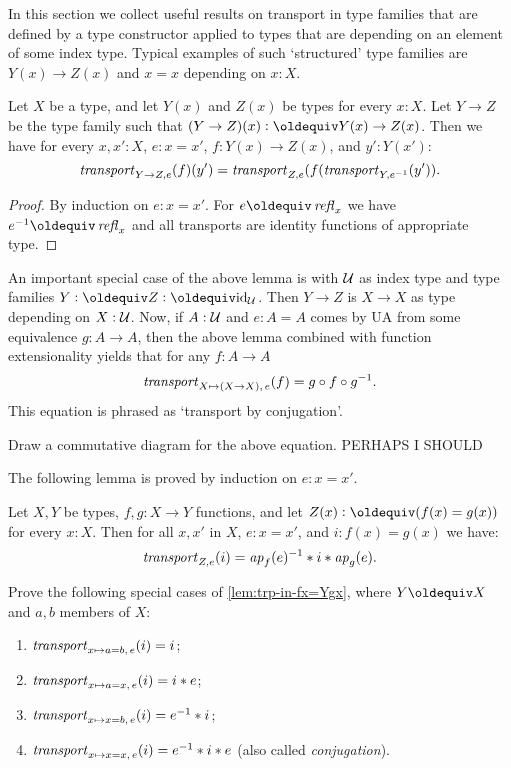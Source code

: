In this section we collect useful results on transport in
type families that are defined by a type constructor applied
to types that are depending on an element of some index type.
Typical examples of such `structured' type families are 
$Y(x)\to Z(x)$ and $x=x$ depending on $x:X$.

\begin{lemma}\label{lem:trp-in-function-type}
Let $X$ be a type, and let $Y(x)$ and $Z(x)$ be types for every $x:X$.
Let $Y\to Z$ be the type family such that $(Y\to Z)(x) \defeq Y(x)\to Z(x)$.
Then we have for every $x,x':X$, $e: x=x'$, $f: Y(x)\to Z(x)$, and $y':Y(x')$:
\[
\mathord{\mathit{transport}}_{Y\to Z, e} (f)(y') = \mathord{\mathit{transport}}_{Z,e} (f(\mathord{\mathit{transport}}_{Y, e^{-1}}(y')).
\]
\end{lemma}
\begin{proof}
By induction on $e: x=x'$. For $e \jdeq \refl{x}$ we have $e^{-1}\jdeq \refl{x}$
and all transports are identity functions of appropriate type. 
\end{proof}

An important special case of the above lemma is with $\mathcal{U}$
as index type and type families $Y\defeq Z\defeq \id_\UU$.
Then $Y\to Z$ is $X\to X$ as type depending on $X:\mathcal{U}$. Now, 
if $A:\mathcal{U}$ and $e: A=A$ comes by UA from some equivalence 
$g:A\to A$, then the above lemma combined with function extensionality 
yields that for any $f: A\to A$
\[
\mathord{\mathit{transport}}_{X\mapsto(X\to X),\,e} (f) = g\circ f \circ g^{-1}.
\]
This equation is phrased as `transport by conjugation'.

\begin{xca}\label{xca:conjugation}
Draw a commutative diagram for the above equation. PERHAPS I SHOULD
\end{xca}

The following lemma is proved by induction on $e: x=x'$.

\begin{lemma}\label{lem:trp-in-fx=Ygx}
Let $X,Y$ be types, $f,g: X\to Y$ functions, and let
$Z(x)\defeq (f(x)=g(x))$ for every $x:X$. 
Then for all $x,x'$ in $X$, $e: x=x'$, and $i: f(x)=g(x)$ we have:
\[
\mathord{\mathit{transport}}_{Z, e} (i) = \mathop{{\it ap}_{f}}(e)^{-1} * i * \mathop{{\it ap}_{g}}(e).
\]
\end{lemma}

\begin{xca}\label{xca:trp-in-a/x=b/x}
Prove the following special cases of \cref{lem:trp-in-fx=Ygx},
where $Y\jdeq X$ and $a,b$ members of $X$:
\begin{enumerate}
\item $\mathord{\mathit{transport}}_{x\mapsto a=b,\,e} (i) = i$;
\item\label{xca-trp-in-a=x} $\mathord{\mathit{transport}}_{x\mapsto a=x,\,e} (i) = i* e$;
\item $\mathord{\mathit{transport}}_{x\mapsto x=b,\,e} (i) = e^{-1}* i$;
\item $\mathord{\mathit{transport}}_{x\mapsto x=x,\,e} (i) = e^{-1}* i* e$ (also called \emph{conjugation}).
\end{enumerate}
\end{xca}

